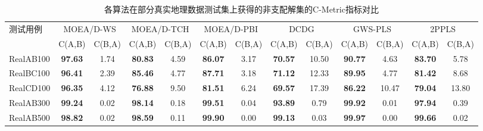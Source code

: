 \begin{table}[!h]
    \small
    \renewcommand\arraystretch{1.2}
    \renewcommand\tabcolsep{2pt}
    \centering
    \caption{各算法在部分真实地理数据测试集上获得的非支配解集的C-Metric指标对比 \label{tab:各算法在真实地理数据测试集上获得的非支配解集的C-Metric指标对比}}
    \begin{threeparttable}
        \begin{tabular}{lcccccccccccc}
            \toprule
            \multirow{2}[4]{*}{测试用例} & \multicolumn{2}{c}{MOEA/D-WS} & \multicolumn{2}{c}{MOEA/D-TCH} & \multicolumn{2}{c}{MOEA/D-PBI} & \multicolumn{2}{c}{DCDG} & \multicolumn{2}{c}{GWS-PLS} & \multicolumn{2}{c}{2PPLS} \\
            \cmidrule{2-13}    & C(A,B)         & C(B,A)       & C(A,B)           & C(B,A)          & C(A,B)          & C(B,A)         & C(A,B)          & C(B,A)        & C(A,B)          & C(B,A) & C(A,B)          & C(B,A) \\
            \midrule
            RealAB100                     & \textbf{97.63}                & 1.74                           & \textbf{80.83}                 & 4.59                     & \textbf{86.07}              & 3.17                      & \textbf{70.57}           & 10.50  & \textbf{90.77}  & 4.63   & \textbf{83.70}  & 5.78  \\
            RealBC100                     & \textbf{96.41}                & 2.39                           & \textbf{85.46}                 & 4.77                     & \textbf{87.71}              & 3.18                      & \textbf{71.12}           & 12.33  & \textbf{89.95}  & 4.77   & \textbf{81.42}  & 8.68  \\
            RealCD100                     & \textbf{96.35}                & 4.12                           & \textbf{76.88}                 & 9.50                     & \textbf{81.51}              & 6.24                      & \textbf{69.57}           & 17.39  & \textbf{86.22}  & 10.47  & \textbf{79.04}  & 13.80  \\
            RealAB300                     & \textbf{99.24}                & 0.02                           & \textbf{98.14}                 & 0.18                     & \textbf{99.51}              & 0.04                      & \textbf{93.89}           & 0.79   & \textbf{99.92}  & 0.01   & \textbf{97.94}  & 0.39  \\
            RealAB500                     & \textbf{98.82}                & 0.02                           & \textbf{98.59}                 & 0.11                     & \textbf{99.90}              & 0.00                      & \textbf{99.13}           & 0.03   & \textbf{99.97}  & 0.00   & \textbf{99.66}  & 0.02  \\

\end{tabular}
\end{threeparttable}
\end{table}
